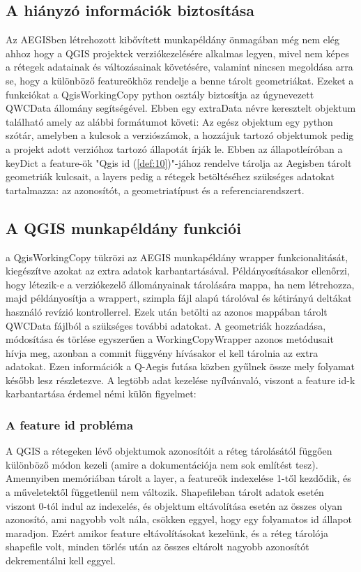 \subsection{A  hiányzó információk biztosítása}
Az AEGISben létrehozott kibővített munkapéldány önmagában még nem elég ahhoz hogy a QGIS projektek verziókezelésére alkalmas legyen, mivel nem képes a rétegek adatainak és változásainak követésére, valamint nincsen megoldása arra se, hogy a különböző featureökhöz rendelje a benne tárolt geometriákat. Ezeket a funkciókat a QgisWorkingCopy python osztály biztosítja az úgynevezett QWCData állomány segítségével. Ebben egy extraData névre keresztelt objektum található amely az alábbi formátumot követi:
Az egész objektum egy python szótár, amelyben a kulcsok a verziószámok, a hozzájuk tartozó objektumok pedig a projekt adott verzióhoz tartozó állapotát írják le. Ebben az állapotleíróban a keyDict a feature-ök "Qgis id (\ref{def:10})"-jához rendelve tárolja az Aegisben tárolt geometriák kulcsait, a layers pedig a rétegek betöltéséhez szükséges adatokat tartalmazza: az azonosítót, a geometriatípust és a referenciarendszert.
\subsection{A QGIS munkapéldány funkciói}
a QgisWorkingCopy tükrözi az AEGIS munkapéldány wrapper funkcionalitását, kiegészítve azokat az extra adatok karbantartásával. Példányosításakor ellenőrzi, hogy létezik-e a verziókezelő állományainak tárolására mappa, ha nem létrehozza, majd példányosítja a wrappert, szimpla fájl alapú tárolóval és kétirányú deltákat használó revízió kontrollerrel. Ezek után betölti az azonos mappában tárolt QWCData fájlból a szükséges további adatokat.
A geometriák hozzáadása, módosítása és törlése egyszerűen a WorkingCopyWrapper azonos metódusait hívja meg, azonban a commit függvény hívásakor el kell tárolnia az extra adatokat. Ezen információk a Q-Aegis futása közben gyűlnek össze mely folyamat később lesz részletezve. A legtöbb adat kezelése nyílvánvaló, viszont a feature id-k karbantartása érdemel némi külön figyelmet:
\subsubsection{A feature id probléma}
A QGIS a rétegeken lévő objektumok azonosítóit a réteg tárolásától függően különböző módon kezeli (amire a dokumentációja nem sok említést tesz). Amennyiben memóriában tárolt a layer, a featureök indexelése 1-től kezdődik, és a műveletektől függetlenül nem változik. Shapefileban tárolt adatok esetén viszont 0-tól indul az indexelés, és objektum eltávolítása esetén az összes olyan azonosító, ami nagyobb volt nála, csökken eggyel, hogy egy folyamatos id állapot maradjon. Ezért amikor feature eltávolításokat kezelünk, és a réteg tárolója shapefile volt, minden törlés után az összes eltárolt nagyobb azonosítót dekrementálni kell eggyel.

